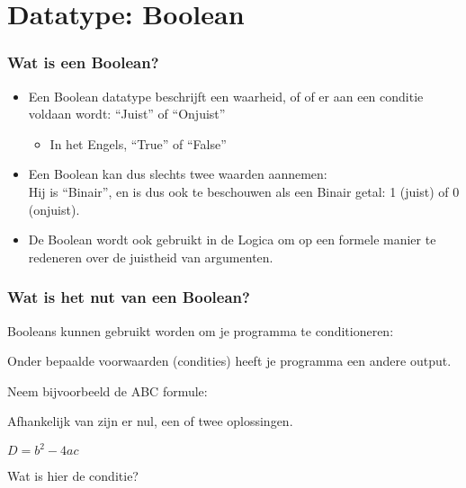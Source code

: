 \section{Datatype: Boolean}


\begin{frame}
\frametitle{Wat is een Boolean?}

\begin{itemize}
  \item<1-> Een Boolean datatype beschrijft een waarheid,
  			of of er aan een conditie voldaan wordt: ``Juist'' of ``Onjuist''
  \begin{itemize}
    \item<2-> In het Engels, ``True'' of ``False''
  \end{itemize}
  \item<3-> Een Boolean kan dus slechts twee waarden aannemen: \\ Hij is ``Binair'',
  			en is dus ook te beschouwen als een Binair getal: 1 (juist) of 0 (onjuist).
  \item<4-> De Boolean wordt ook gebruikt in de Logica om op een formele manier
  			te redeneren over de juistheid van argumenten.		
\end{itemize}

\end{frame}





\begin{frame}
\frametitle{Wat is het nut van een Boolean?}

Booleans kunnen gebruikt worden om je programma te conditioneren:

Onder bepaalde voorwaarden (condities) heeft je programma een andere output.

\vspace{0.5cm}
\pause %
Neem bijvoorbeeld de ABC formule:

\pause %
Afhankelijk van
zijn er nul, een of twee oplossingen.

$D=b^2-4ac$

\vspace{0.3cm}
\pause %
Wat is hier de conditie?
\pause %

\end{frame}





